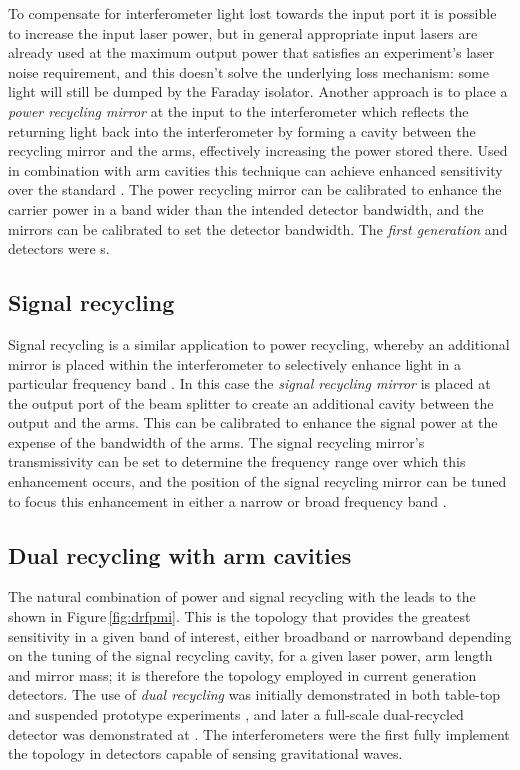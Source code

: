 To compensate for interferometer light lost towards the input port it is possible to increase the input laser power, but in general appropriate input lasers are already used at the maximum output power that satisfies an experiment's laser noise requirement, and this doesn't solve the underlying loss mechanism: some light will still be dumped by the Faraday isolator. Another approach is to place a \emph{power recycling mirror} at the input to the interferometer which reflects the returning light back into the interferometer by forming a cavity between the recycling mirror and the arms, effectively increasing the power stored there. Used in combination with \FP{} arm cavities this technique can achieve enhanced sensitivity over the standard \MI{}. The power recycling mirror can be calibrated to enhance the carrier power in a band wider than the intended detector bandwidth, and the \FP{} mirrors can be calibrated to set the detector bandwidth. The \emph{first generation} \ILIGO{} and \IVIRGO{} detectors were \PRFPMI{}s.

\subsection{\label{sec:signal-recycling}Signal recycling}
Signal recycling is a similar application to power recycling, whereby an additional mirror is placed within the interferometer to selectively enhance light in a particular frequency band \cite{Meers1988}. In this case the \emph{signal recycling mirror} is placed at the output port of the beam splitter to create an additional cavity between the output and the arms. This can be calibrated to enhance the signal power at the expense of the bandwidth of the arms. The signal recycling mirror's transmissivity can be set to determine the frequency range over which this enhancement occurs, and the position of the signal recycling mirror can be tuned to focus this enhancement in either a narrow or broad frequency band \cite{Buonanno2001}.

\subsection{Dual recycling with \FP{} arm cavities}
The natural combination of power and signal recycling with the \FPMI{} leads to the \emph{\DRFPMI{}} shown in Figure\,\ref{fig:drfpmi}. This is the topology that provides the greatest sensitivity in a given band of interest, either broadband or narrowband depending on the tuning of the signal recycling cavity, for a given laser power, arm length and mirror mass; it is therefore the topology employed in current generation detectors. The use of \emph{dual recycling} was initially demonstrated in both table-top and suspended prototype experiments \cite{Strain1991, Heinzel1998, Freise2000}, and later a full-scale dual-recycled \MI{} detector was demonstrated at \GEO{} \cite{Heinzel2002, Grote2004}. The \ALIGO{} interferometers were the first fully implement the \DRFPMI{} topology in detectors capable of sensing gravitational waves.

